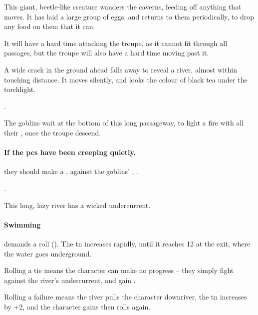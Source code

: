 \begin{multicols}{2}
This giant, beetle-like creature%
wanders the caverns, feeding off anything that moves.
It has laid a large group of eggs, and returns to them periodically, to drop any food on them that it can.

It will have a hard time attacking the troupe, as it cannot fit through all passages, but the troupe will also have a hard time moving past it.

\umberhulk

\begin{boxtext}
  A wide crack in the ground ahead falls away to reveal a river, almost within touching distance.
  It moves silently, and looks the colour of black tea under the torchlight.
\end{boxtext}

.


The goblins wait at the bottom of this long passageway, to light a fire with all their \fireFuel, once the troupe descend.




\paragraph{If the \glspl{pc} have been creeping quietly,}
they should make a , against the goblins' , \tn.

.


This long, lazy river has a wicked undercurrent.

\paragraph{Swimming}
demands a  roll (\tn[5]).
The \gls{tn} increases rapidly, until it reaches 12 at the exit, where the water goes underground.

Rolling a tie means the character can make no progress -- they simply fight against the river's undercurrent, and gain .

Rolling a failure means the river pulls the character downriver, the \gls{tn} increases by +2, and the character gains  then rolls again.


\end{multicols}
